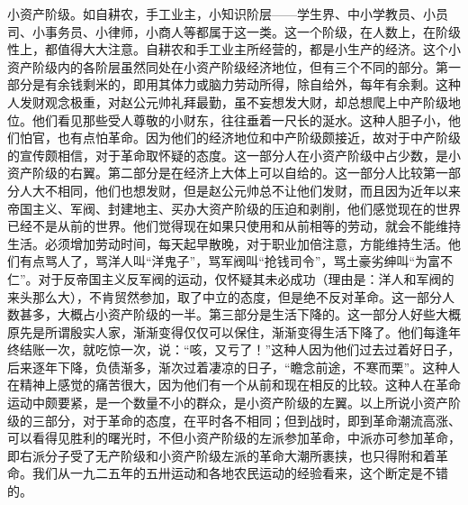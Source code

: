 小资产阶级。如自耕农，手工业主，小知识阶层——学生界、中小学教员、小员司、小事务员、小律师，小商人等都属于这一类。这一个阶级，在人数上，在阶级性上，都值得大大注意。自耕农和手工业主所经营的，都是小生产的经济。这个小资产阶级内的各阶层虽然同处在小资产阶级经济地位，但有三个不同的部分。第一部分是有余钱剩米的，即用其体力或脑力劳动所得，除自给外，每年有余剩。这种人发财观念极重，对赵公元帅礼拜最勤，虽不妄想发大财，却总想爬上中产阶级地位。他们看见那些受人尊敬的小财东，往往垂着一尺长的涎水。这种人胆子小，他们怕官，也有点怕革命。因为他们的经济地位和中产阶级颇接近，故对于中产阶级的宣传颇相信，对于革命取怀疑的态度。这一部分人在小资产阶级中占少数，是小资产阶级的右翼。第二部分是在经济上大体上可以自给的。这一部分人比较第一部分人大不相同，他们也想发财，但是赵公元帅总不让他们发财，而且因为近年以来帝国主义、军阀、封建地主、买办大资产阶级的压迫和剥削，他们感觉现在的世界已经不是从前的世界。他们觉得现在如果只使用和从前相等的劳动，就会不能维持生活。必须增加劳动时间，每天起早散晚，对于职业加倍注意，方能维持生活。他们有点骂人了，骂洋人叫“洋鬼子”，骂军阀叫“抢钱司令”，骂土豪劣绅叫“为富不仁”。对于反帝国主义反军阀的运动，仅怀疑其未必成功（理由是：洋人和军阀的来头那么大），不肯贸然参加，取了中立的态度，但是绝不反对革命。这一部分人数甚多，大概占小资产阶级的一半。第三部分是生活下降的。这一部分人好些大概原先是所谓殷实人家，渐渐变得仅仅可以保住，渐渐变得生活下降了。他们每逢年终结账一次，就吃惊一次，说：“咳，又亏了！”这种人因为他们过去过着好日子，后来逐年下降，负债渐多，渐次过着凄凉的日子，“瞻念前途，不寒而栗”。这种人在精神上感觉的痛苦很大，因为他们有一个从前和现在相反的比较。这种人在革命运动中颇要紧，是一个数量不小的群众，是小资产阶级的左翼。以上所说小资产阶级的三部分，对于革命的态度，在平时各不相同；但到战时，即到革命潮流高涨、可以看得见胜利的曙光时，不但小资产阶级的左派参加革命，中派亦可参加革命，即右派分子受了无产阶级和小资产阶级左派的革命大潮所裹挟，也只得附和着革命。我们从一九二五年的五卅运动和各地农民运动的经验看来，这个断定是不错的。

